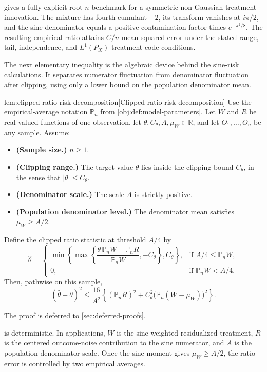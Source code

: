 \documentclass[11pt]{article}
\begin{document}
 gives a fully explicit root-\(n\) benchmark for a symmetric non-Gaussian treatment innovation. The mixture has fourth cumulant \(-2\), its transform vanishes at \(i\pi/2\), and the sine denominator equals a positive contamination factor times \(e^{-\pi^2/8}\). The resulting empirical ratio attains \(C/n\) mean-squared error under the stated range, tail, independence, and \(L^1(P_X)\) treatment-code conditions.

The next elementary inequality is the algebraic device behind the sine-risk calculations. It separates numerator fluctuation from denominator fluctuation after clipping, using only a lower bound on the population denominator mean.

\begin{lemmav}{lem:clipped-ratio-risk-decomposition}[Clipped ratio risk decomposition]
Use the empirical-average notation \(\mathbb P_n\) from \cref{obj:def:model-parameters}. Let \(W\) and \(R\) be real-valued functions of one observation, let \(\theta,C_{\theta},A,\mu_W\in\mathbb R\), and let \(O_1,\ldots,O_n\) be any sample. Assume:
\begin{itemize}
\item \textbf{(Sample size.)} \(n\ge 1\).
\item \textbf{(Clipping range.)} The target value \(\theta\) lies inside the clipping bound \(C_{\theta}\), in the sense that \(|\theta|\le C_{\theta}\).
\item \textbf{(Denominator scale.)} The scale \(A\) is strictly positive.
\item \textbf{(Population denominator level.)} The denominator mean satisfies \(\mu_W\ge A/2\).
\end{itemize}
Define the clipped ratio statistic at threshold \(A/4\) by
\[
\widehat\theta
=
\begin{cases}
\min\!\left\{\max\!\left\{\dfrac{\theta\,\mathbb P_n W+\mathbb P_n R}{\mathbb P_n W},-C_{\theta}\right\},C_{\theta}\right\},
& \text{if } A/4\le \mathbb P_n W,\\
0,
& \text{if } \mathbb P_n W<A/4.
\end{cases}
\]
Then, pathwise on this sample,
\[
(\widehat\theta-\theta)^2
\le
\frac{16}{A^2}
\left\{
(\mathbb P_n R)^2
+
C_{\theta}^2\bigl(\mathbb P_n(W-\mu_W)\bigr)^2
\right\}.
\]
\end{lemmav}

The proof is deferred to \cref{sec:deferred-proofs}.

 is deterministic. In applications, \(W\) is the sine-weighted residualized treatment, \(R\) is the centered outcome-noise contribution to the sine numerator, and \(A\) is the population denominator scale. Once the sine moment gives \(\mu_W\ge A/2\), the ratio error is controlled by two empirical averages.
\end{document}
